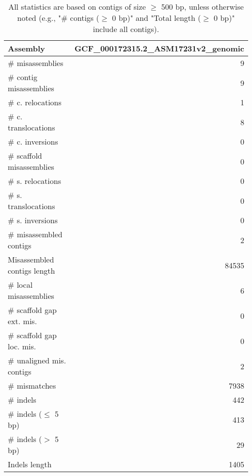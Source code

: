 \documentclass[12pt,a4paper]{article}
\begin{document}
\begin{table}[ht]
\begin{center}
\caption{All statistics are based on contigs of size $\geq$ 500 bp, unless otherwise noted (e.g., "\# contigs ($\geq$ 0 bp)" and "Total length ($\geq$ 0 bp)" include all contigs).}
\begin{tabular}{|l*{1}{|r}|}
\hline
Assembly & GCF\_000172315.2\_ASM17231v2\_genomic \\ \hline
\# misassemblies & 9 \\ \hline
\hspace{2mm}\# contig misassemblies & 9 \\ \hline
\hspace{5mm}\# c. relocations & 1 \\ \hline
\hspace{5mm}\# c. translocations & 8 \\ \hline
\hspace{5mm}\# c. inversions & 0 \\ \hline
\hspace{2mm}\# scaffold misassemblies & 0 \\ \hline
\hspace{5mm}\# s. relocations & 0 \\ \hline
\hspace{5mm}\# s. translocations & 0 \\ \hline
\hspace{5mm}\# s. inversions & 0 \\ \hline
\# misassembled contigs & 2 \\ \hline
Misassembled contigs length & 84535 \\ \hline
\# local misassemblies & 6 \\ \hline
\# scaffold gap ext. mis. & 0 \\ \hline
\# scaffold gap loc. mis. & 0 \\ \hline
\# unaligned mis. contigs & 2 \\ \hline
\# mismatches & 7938 \\ \hline
\# indels & 442 \\ \hline
\hspace{5mm}\# indels ($\leq$ 5 bp) & 413 \\ \hline
\hspace{5mm}\# indels ($>$ 5 bp) & 29 \\ \hline
Indels length & 1405 \\ \hline
\end{tabular}
\end{center}
\end{table}
\end{document}
